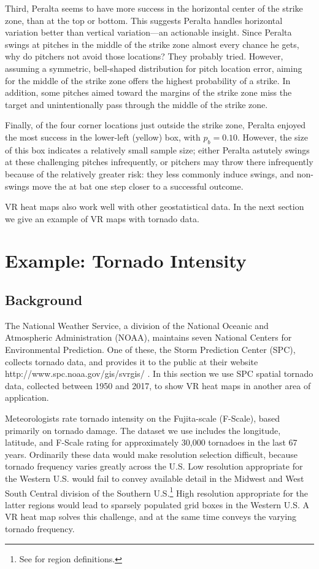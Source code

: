 Third, Peralta seems to have more success in the horizontal center of the strike zone, than at the top or bottom. This suggests Peralta handles horizontal variation better than vertical variation---an actionable insight. Since Peralta swings at pitches in the middle of the strike zone almost every chance he gets, why do pitchers not avoid those locations? They probably tried. However, assuming a symmetric, bell-shaped distribution for pitch location error, aiming for the middle of the strike zone offers the highest probability of a strike. In addition, some pitches aimed toward the margins of the strike zone miss the target and unintentionally pass through the middle of the strike zone. 

Finally, of the four corner locations just outside the strike zone, Peralta enjoyed the most success in the lower-left (yellow) box, with $p_{b} = 0.10$. However, the size of this box indicates a relatively small sample size; either Peralta astutely swings at these challenging pitches infrequently, or pitchers may throw there infrequently because of the relatively greater risk: they less commonly induce swings, and non-swings move the at bat one step closer to a successful outcome. 

VR heat maps also work well with other geostatistical data. In the next section we give an example of VR maps with tornado data.

\section{Example: Tornado Intensity} \label{ETI}

\subsection{Background}

The National Weather Service, a division of the National Oceanic and Atmospheric Administration (NOAA), maintains seven National Centers for Environmental Prediction. One of these, the Storm Prediction Center (SPC), collects tornado data, and provides it to the public at their website http://www.spc.noaa.gov/gis/svrgis/ \citep{NOAA}. In this section we use SPC spatial tornado data, collected between 1950 and 2017, to show VR heat maps in another area of application. 

Meteorologists rate tornado intensity on the Fujita-scale (F-Scale), based primarily on tornado damage. The dataset we use includes the longitude, latitude, and F-Scale rating for approximately 30,000 tornadoes in the last 67 years. Ordinarily these data would make resolution selection difficult, because tornado frequency varies greatly across the U.S. Low resolution appropriate for the Western U.S. would fail to convey available detail in the Midwest and West South Central division of the Southern U.S.\footnote{See \cite{regions} for region definitions.} High resolution appropriate for the latter regions would lead to sparsely populated grid boxes in the Western U.S. A VR heat map solves this challenge, and at the same time conveys the varying tornado frequency. 

